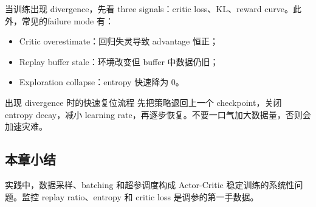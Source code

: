 当训练出现 divergence，先看 three signals：critic loss、KL、reward curve。此外，常见的failure mode 有：
\begin{itemize}
    \item Critic overestimate：回归失灵导致 advantage 恒正；
    \item Replay buffer stale：环境改变但 buffer 中数据仍旧；
    \item Exploration collapse：entropy 快速降为 0。
\end{itemize}

\begin{warningbox}{出现 divergence 时的快速复位流程}
先把策略退回上一个 checkpoint，关闭 entropy decay，减小 learning rate，再逐步恢复。不要一口气加大数据量，否则会加速灾难。
\end{warningbox}

\subsection{本章小结}

实践中，数据采样、batching 和超参调度构成 Actor-Critic 稳定训练的系统性问题。监控 replay ratio、entropy 和 critic loss 是调参的第一手数据。

